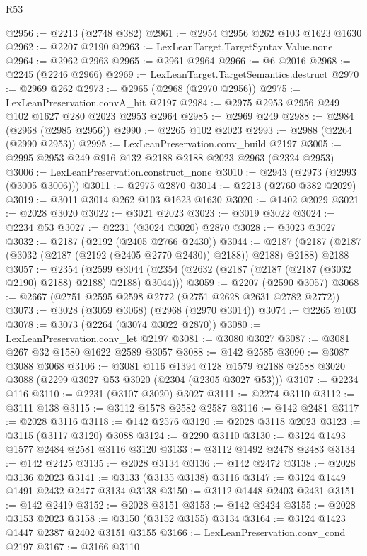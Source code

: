 \begin{lexlean}{R53}
\begin{coremodule}
@2956 := @2213 (@2748 @382)
@2961 := @2954 @2956 @262 @103 @1623 @1630
@2962 := @2207 @2190
@2963 := LexLeanTarget.TargetSyntax.Value.none
@2964 := @2962 @2963
@2965 := @2961 @2964
@2966 := @6 @2016
@2968 := @2245 (@2246 @2966)
@2969 := LexLeanTarget.TargetSemantics.destruct
@2970 := @2969 @262
@2973 := @2965 (@2968 (@2970 @2956))
@2975 := LexLeanPreservation.convA_hit @2197
@2984 := @2975 @2953 @2956 @249 @102 @1627 @280 @2023 @2953 @2964
@2985 := @2969 @249
@2988 := @2984 (@2968 (@2985 @2956))
@2990 := @2265 @102 @2023
@2993 := @2988 (@2264 (@2990 @2953))
@2995 := LexLeanPreservation.conv_build @2197
@3005 := @2995 @2953 @249 @916 @132 @2188 @2188 @2023 @2963 (@2324 @2953)
@3006 := LexLeanPreservation.construct_none
@3010 := @2943 (@2973 (@2993 (@3005 @3006)))
@3011 := @2975 @2870
@3014 := @2213 (@2760 @382 @2029)
@3019 := @3011 @3014 @262 @103 @1623 @1630
@3020 := @1402 @2029
@3021 := @2028 @3020
@3022 := @3021 @2023
@3023 := @3019 @3022
@3024 := @2234 @53
@3027 := @2231 (@3024 @3020) @2870
@3028 := @3023 @3027
@3032 := @2187 (@2192 (@2405 @2766 @2430))
@3044 := @2187 (@2187 (@2187 (@3032 (@2187 (@2192 (@2405 @2770 @2430)) @2188)) @2188) @2188) @2188
@3057 := @2354
    (@2599 @3044 (@2354 (@2632 (@2187 (@2187 (@2187 (@3032 @2190) @2188) @2188) @2188) @3044)))
@3059 := @2207 (@2590 @3057)
@3068 := @2667 (@2751 @2595 @2598 @2772 (@2751 @2628 @2631 @2782 @2772))
@3073 := @3028 (@3059 @3068) (@2968 (@2970 @3014))
@3074 := @2265 @103
@3078 := @3073 (@2264 (@3074 @3022 @2870))
@3080 := LexLeanPreservation.conv_let @2197
@3081 := @3080 @3027
@3087 := @3081 @267 @32 @1580 @1622 @2589 @3057
@3088 := @142 @2585
@3090 := @3087 @3088 @3068
@3106 := @3081
    @116
    @1394
    @128
    @1579
    @2188
    @2588
    @3020
    @3088
    (@2299 @3027 @53 @3020 (@2304 (@2305 @3027 @53)))
@3107 := @2234 @116
@3110 := @2231 (@3107 @3020) @3027
@3111 := @2274 @3110
@3112 := @3111 @138
@3115 := @3112 @1578 @2582 @2587
@3116 := @142 @2481
@3117 := @2028 @3116
@3118 := @142 @2576
@3120 := @2028 @3118 @2023
@3123 := @3115 (@3117 @3120) @3088
@3124 := @2290 @3110
@3130 := @3124 @1493 @1577 @2484 @2581 @3116 @3120
@3133 := @3112 @1492 @2478 @2483
@3134 := @142 @2425
@3135 := @2028 @3134
@3136 := @142 @2472
@3138 := @2028 @3136 @2023
@3141 := @3133 (@3135 @3138) @3116
@3147 := @3124 @1449 @1491 @2432 @2477 @3134 @3138
@3150 := @3112 @1448 @2403 @2431
@3151 := @142 @2419
@3152 := @2028 @3151
@3153 := @142 @2424
@3155 := @2028 @3153 @2023
@3158 := @3150 (@3152 @3155) @3134
@3164 := @3124 @1423 @1447 @2387 @2402 @3151 @3155
@3166 := LexLeanPreservation.conv_cond @2197
@3167 := @3166 @3110

\end{coremodule}
\end{lexlean}
